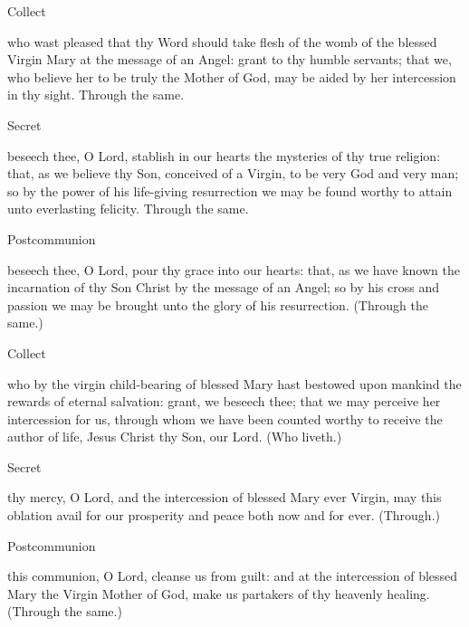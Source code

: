 
   \label{SPMaryInAdvent}
   \begin{inhead}
   	Collect
   \end{inhead}
    who wast pleased that thy Word should take flesh of the womb of the blessed Virgin Mary at the message of an Angel: grant to thy humble servants; that we, who believe her to be truly the Mother of God, may be aided by her intercession in thy sight. Through the same.
  \begin{inhead}
  	Secret
  \end{inhead}
    beseech thee, O Lord, stablish in our hearts the mysteries of thy true religion: that, as we believe thy Son, conceived of a Virgin, to be very God and very man; so by the power of his life-giving resurrection we may be found worthy to attain unto everlasting felicity. Through the same.
   \begin{inhead}
   	Postcommunion
   \end{inhead}
    beseech thee, O Lord, pour thy grace into our hearts: that, as we have known the incarnation of thy Son Christ by the message of an Angel; so by his cross and passion we may be brought unto the glory of his resurrection. (Through the same.)


    \label{SPMaryPostChristmas}
   \begin{inhead}
   	Collect
   \end{inhead}
     who by the virgin child-bearing of blessed Mary hast bestowed upon mankind the rewards of eternal salvation: grant, we beseech thee; that we may perceive her intercession for us, through whom we have been counted worthy to receive the author of life, Jesus Christ thy Son, our Lord. (Who liveth.)
  \begin{inhead}
  	Secret
  \end{inhead}
     thy mercy, O Lord, and the intercession of blessed Mary ever Virgin, may this oblation avail for our prosperity and peace both now and for ever. (Through.)
   \begin{inhead}
   	Postcommunion
   \end{inhead}
     this communion, O Lord, cleanse us from guilt: and at the intercession of blessed Mary the Virgin Mother of God, make us partakers of thy heavenly healing. (Through the same.)
    

